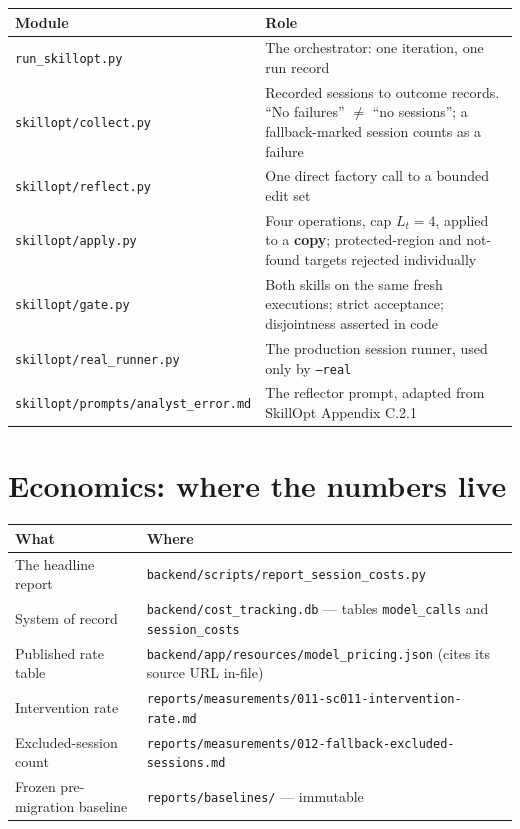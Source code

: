 \documentclass[11pt,a4paper]{article}
\begin{document}
\begin{longtable}{@{}p{}p{}@{}}
\toprule
\textbf{Module} & \textbf{Role} \\
\midrule
\endhead
\texttt{run\_skillopt.py} & The orchestrator: one iteration, one run record \\
\texttt{skillopt/collect.py} & Recorded sessions to outcome records. ``No failures''
$\neq$ ``no sessions''; a fallback-marked session counts as a failure \\
\texttt{skillopt/reflect.py} & One direct factory call to a bounded edit set \\
\texttt{skillopt/apply.py} & Four operations, cap $L_t = 4$, applied to a
\textbf{copy}; protected-region and not-found targets rejected individually \\
\texttt{skillopt/gate.py} & Both skills on the same fresh executions; strict
acceptance; disjointness asserted in code \\
\texttt{skillopt/real\_runner.py} & The production session runner, used only by
\texttt{--real} \\
\texttt{skillopt/prompts/analyst\_error.md} & The reflector prompt, adapted from
SkillOpt Appendix C.2.1 \\
\bottomrule
\end{longtable}

\section{Economics: where the numbers live}

\begin{longtable}{@{}p{}p{}@{}}
\toprule
\textbf{What} & \textbf{Where} \\
\midrule
\endhead
The headline report & \texttt{backend/scripts/report\_session\_costs.py} \\
System of record & \texttt{backend/cost\_tracking.db} --- tables
\texttt{model\_calls} and \texttt{session\_costs} \\
Published rate table & \texttt{backend/app/resources/model\_pricing.json} (cites its
source URL in-file) \\
Intervention rate & \texttt{reports/measurements/011-sc011-intervention-rate.md} \\
Excluded-session count & \texttt{reports/measurements/012-fallback-excluded-sessions.md} \\
Frozen pre-migration baseline & \texttt{reports/baselines/} --- immutable \\
\bottomrule
\end{longtable}
\end{document}
